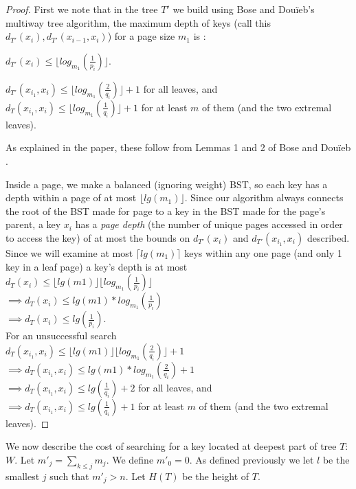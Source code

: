 \documentclass[letterpaper,12pt,titlepage,oneside,final]{book}
\theoremstyle{plain}
\begin{document}
\begin{proof}
First we note that in the tree $T'$ we build using Bose and Dou\"{i}eb's multiway tree algorithm, the maximum depth of keys (call this $d_{T'}(x_i), d_{T'}(x_{i-1},x_i)$) for a page size $m_1$ is \cite{bose2009efficient}:
\begin{center} $d_{T'}(x_i) \leq \lfloor log_{m_1}(\frac{1}{p_i}) \rfloor$. \end{center} 
\begin{center} $d_{T'}(x_{i_1},x_i) \leq \lfloor log_{m_1}(\frac{2}{q_i}) \rfloor + 1$ for all leaves, and\\
 $d_T(x_{i_1},x_i) \leq \lfloor log_{m_1}(\frac{1}{q_i}) \rfloor + 1$ for at least $m$ of them (and the two extremal leaves). \end{center}
As explained in the paper, these follow from Lemmas 1 and 2 of Bose and Dou\"{i}eb \cite{bose2009efficient}.

Inside a page, we make a balanced (ignoring weight) BST, so each key has a depth within a page of at most $\lfloor lg(m_1) \rfloor$. Since our algorithm always connects the root of the BST made for page to a key in the BST made for the page's parent, a key $x_i$ has a \textit{page depth} (the number of unique pages accessed in order to access the key) of at most  the bounds on $d_{T'}(x_i)$ and $d_{T'}(x_{i_1},x_i)$ described. Since we will examine at most $\lceil lg(m_1) \rceil$ keys within any one page (and only 1 key in a leaf page) a key's depth is at most \\
$d_T(x_i) \leq \lfloor lg(m1) \rfloor \lfloor log_{m_1}(\frac{1}{p_i}) \rfloor$ \\
$\implies d_T(x_i) \leq lg(m1)*log_{m_1}(\frac{1}{p_i})$ \\
$\implies d_T(x_i) \leq lg(\frac{1}{p_i})$. \\
For an unsuccessful search \\
$d_T(x_{i_1},x_i) \leq \lfloor lg(m1) \rfloor \lfloor log_{m_1}(\frac{2}{q_i}) \rfloor + 1$ \\
$\implies d_T(x_{i_1},x_i) \leq lg(m1)*log_{m_1}(\frac{2}{q_i}) + 1$ \\
$\implies d_T(x_{i_1},x_i) \leq lg(\frac{1}{q_i}) + 2$ for all leaves, and \\
$\implies d_T(x_{i_1},x_i) \leq lg(\frac{1}{q_i}) + 1$ for at least $m$ of them (and the two extremal leaves).


\end{proof}

We now describe the cost of searching for a key located at deepest part of tree $T$: $W$. Let $m'_j = \sum_{k \leq j} m_j$. We define $m'_0 = 0$. As defined previously we let $l$ be the smallest $j$ such that $m'_j > n$. Let $H(T)$ be the height of $T$.
\end{document}
